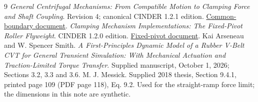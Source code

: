 \documentclass[11pt,letterpaper]{article}
\numberwithin{equation}{section}
\begin{document}
\begin{thebibliography}{9}
 \emph{General Centrifugal Mechanisms: From Compatible Motion to
Clamping Force and Shaft Coupling}. Revision 4; canonical CINDER 1.2.1 edition.
\href{../common_boundary/formulation.pdf}{Common-boundary document}.
 \emph{Clamping Mechanism Implementations: The Fixed-Pivot Roller
Flyweight}. CINDER 1.2.0 edition.
\href{../fixed_pivot/formulation.pdf}{Fixed-pivot document}.
 Kai Arseneau and W. Spencer Smith.
\emph{A First-Principles Dynamic Model of a Rubber V-Belt CVT for General
Transient Simulation: With Mechanical Actuation and Traction-Limited Torque
Transfer}. Supplied manuscript, October 1, 2026; Sections 3.2, 3.3 and 3.6.
 M. J. Messick. Supplied 2018 thesis, Section 9.4.1,
printed page 109 (PDF page 118), Eq. 9.2. Used for the straight-ramp force limit;
the dimensions in this note are synthetic.
\end{thebibliography}
\end{document}
